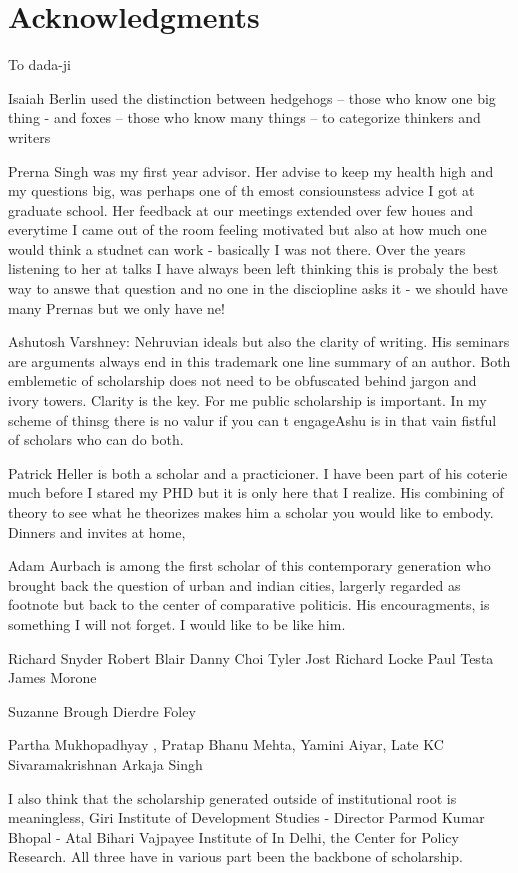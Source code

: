 \chapter{Acknowledgments}

To dada-ji 

Isaiah Berlin used the distinction between hedgehogs – those who know one big thing - and foxes – those who know many things – to categorize thinkers and writers

Prerna Singh was my first year advisor. Her advise to keep my health high and my questions big, was perhaps one of th emost consiounstess advice I got at graduate school. Her feedback at our meetings extended over few houes and everytime I came out of the room feeling motivated but also at how much one would think a studnet can work - basically I was not there. Over the years listening to her at talks I have always been left thinking this is probaly the best way to answe that question and no one in the disciopline asks it - we should have many Prernas but we only have ne!

Ashutosh Varshney: Nehruvian ideals but also the clarity of writing. His seminars are arguments always end in this trademark one line summary of an author. Both emblemetic of scholarship does not need to be obfuscated behind jargon and ivory towers. Clarity is the key. For me public scholarship is important. In  my scheme of thinsg there is no valur if you can t engageAshu is in that vain fistful of scholars who can do both. 

Patrick Heller is both a scholar and a practicioner. I have been part of his coterie much before I stared my PHD but it is only here that I realize. His combining of theory to see what he theorizes makes him a scholar you would like to embody. Dinners and invites at home, 

Adam Aurbach is among the first scholar of this contemporary generation who brought back the question of urban and indian cities, largerly regarded as footnote but back to the center of comparative politicis. His encouragments, is something I will not forget. I would like to be like him. 

Richard Snyder 
Robert Blair  
Danny Choi 
Tyler Jost 
Richard Locke
Paul Testa
James Morone

Suzanne Brough
Dierdre Foley

Partha Mukhopadhyay , Pratap Bhanu Mehta, Yamini Aiyar, Late KC Sivaramakrishnan Arkaja Singh 

I also think that the scholarship generated outside of institutional root is meaningless, Giri Institute of Development Studies - Director Parmod Kumar 
Bhopal - Atal Bihari Vajpayee Institute of 
In Delhi, the Center for Policy Research. All three have in various part been the backbone of scholarship. 

